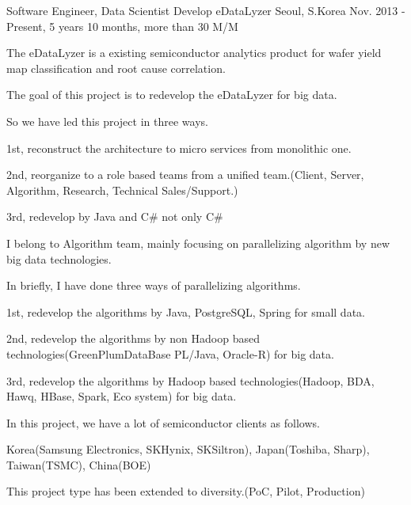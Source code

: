 

\begin{cventries}

  \cventry
    {Software Engineer, Data Scientist} %
    {Develop eDataLyzer} %
    {Seoul, S.Korea} %
    {Nov. 2013 - Present, 5 years 10 months, more than 30 M/M} %
    {
      \begin{cvitems} %
        \item {The eDataLyzer is a existing semiconductor analytics product for wafer yield map classification and root cause correlation.}
        \item {The goal of this project is to redevelop the eDataLyzer for big data.}
        \item {So we have led this project in three ways.}
        \item {1st, reconstruct the architecture to micro services from monolithic one.}
        \item {2nd, reorganize to a role based teams from a unified team.(Client, Server, Algorithm, Research, Technical Sales/Support.)}
        \item {3rd, redevelop by Java and C\# not only C\#}
        \item {I belong to Algorithm team, mainly focusing on parallelizing algorithm by new big data technologies.}
        \item {In briefly, I have done three ways of parallelizing algorithms.}
        \item {1st, redevelop the algorithms by Java, PostgreSQL, Spring for small data.}
        \item {2nd, redevelop the algorithms by non Hadoop based technologies(GreenPlumDataBase PL/Java, Oracle-R) for big data.}
        \item {3rd, redevelop the algorithms by Hadoop based technologies(Hadoop, BDA, Hawq, HBase, Spark, Eco system) for big data.}
        \item {In this project, we have a lot of semiconductor clients as follows.}
        \item {Korea(Samsung Electronics, SKHynix, SKSiltron), Japan(Toshiba, Sharp), Taiwan(TSMC), China(BOE)}
        \item {This project type has been extended to diversity.(PoC, Pilot, Production)}
      \end{cvitems}
    }


\end{cventries}
